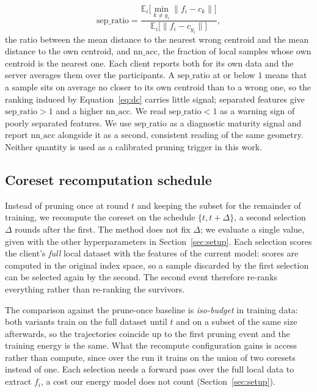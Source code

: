\documentclass[conference]{IEEEtran}
\begin{document}
\begin{equation}
\mathrm{sep\_ratio} = \frac{\mathbb{E}_i \bigl[ \min_{k \neq y_i} \lVert f_i - c_k \rVert \bigr]}{\mathbb{E}_i \bigl[ \lVert f_i - c_{y_i} \rVert \bigr]} ,
\label{eq:sep}
\end{equation}
the ratio between the mean distance to the nearest wrong centroid and the mean
distance to the own centroid, and $\mathrm{nn\_acc}$, the fraction of local samples
whose own centroid is the nearest one. Each client reports both for its own data and
the server averages them over the participants. A $\mathrm{sep\_ratio}$ at or below
$1$ means that a sample sits on average no closer to its own centroid than to a wrong
one, so the ranking induced by Equation~\eqref{eq:dc} carries little signal;
separated features give $\mathrm{sep\_ratio} > 1$ and a higher $\mathrm{nn\_acc}$. We
read $\mathrm{sep\_ratio} < 1$ as a warning sign of poorly separated features. We
use $\mathrm{sep\_ratio}$ as a diagnostic maturity signal and report $\mathrm{nn\_acc}$
alongside it as a second, consistent reading of the same geometry. Neither quantity
is used as a calibrated pruning trigger in this work.

\subsection{Coreset recomputation schedule}
Instead of pruning once at round $t$ and keeping the subset for the remainder of
training, we recompute the coreset on the schedule $\{t, t+\Delta\}$, a second selection
$\Delta$ rounds after the first. The method does not fix $\Delta$; we evaluate a single
value, given with the other hyperparameters in Section~\ref{sec:setup}. Each selection
scores the client's \emph{full} local dataset with the features of the current model:
scores are computed in the original index space, so a sample discarded by the first
selection can be selected again by the second. The second event therefore re-ranks
everything rather than re-ranking the survivors.

The comparison against the prune-once baseline is \emph{iso-budget} in training data: both variants
train on the full dataset until $t$ and on a subset of the same size afterwards, so
the trajectories coincide up to the first pruning event and the training energy is
the same. What the recompute configuration gains is access rather than compute, since over the
run it trains on the union of two coresets instead of one. Each selection needs a
forward pass over the full local data to extract $f_i$, a cost our energy model does
not count (Section~\ref{sec:setup}).
\end{document}
